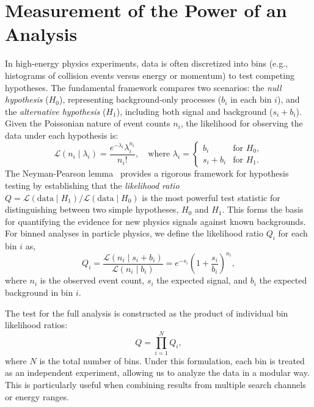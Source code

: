 \section{Measurement of the Power of an Analysis}
\label{sec:power_analysis}

In high-energy physics experiments, data is often discretized into bins (e.g., histograms of collision events versus energy or momentum) to test competing hypotheses. The fundamental framework compares two scenarios: the \textit{null hypothesis} ($H_0$), representing background-only processes ($b_i$ in each bin $i$), and the \textit{alternative hypothesis} ($H_1$), including both signal and background ($s_i + b_i$). Given the Poissonian nature of event counts $n_i$, the likelihood for observing the data under each hypothesis is:
\begin{equation}
    \mathcal{L}(n_i \mid \lambda_i) = \frac{e^{-\lambda_i} \lambda_i^{n_i}}{n_i!}, \quad \text{where } \lambda_i = 
    \begin{cases}
        b_i & \text{for } H_0, \\
        s_i + b_i & \text{for } H_1.
    \end{cases}
\end{equation}
The Neyman-Pearson lemma~\parencite{NeymanPearson1933} provides a rigorous framework for hypothesis testing by establishing that the \textit{likelihood ratio} $Q = \mathcal{L}(\text{data} \mid H_1)/\mathcal{L}(\text{data} \mid H_0)$ is the most powerful test statistic for distinguishing between two simple hypotheses, $H_0$ and $H_1$. This forms the basis for quantifying the evidence for new physics signals against known backgrounds. For binned analyses in particle physics, we define the likelihood ratio $Q_i$ for each bin $i$ as,
\begin{equation}
Q_i = \frac{\mathcal{L}(n_i \mid s_i + b_i)}{\mathcal{L}(n_i \mid b_i)} = e^{-s_i} \left( 1+\frac{s_i}{b_i} \right)^{n_i},
\end{equation}
where $n_i$ is the observed event count, $s_i$ the expected signal, and $b_i$ the expected background in bin $i$. 

The test for the full analysis is constructed as the product of individual bin likelihood ratios:
\begin{equation}
Q = \prod_{i=1}^{N} Q_i,
\end{equation}
where $N$ is the total number of bins. Under this formulation, each bin is treated as an independent experiment, allowing us to analyze the data in a modular way. This is particularly useful when combining results from multiple search channels or energy ranges. 

